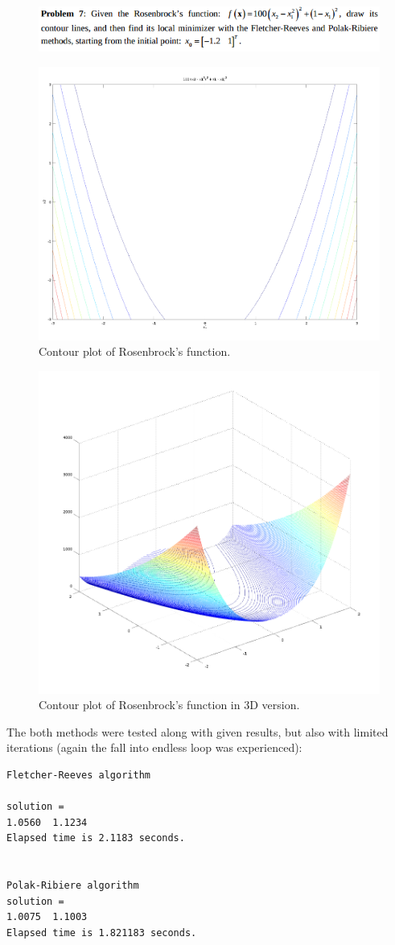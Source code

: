 \documentclass[eng,openany]{mgr}
\begin{document}
\clearpage
\begin{figure}[h]
\centering
\includegraphics[width=0.7\linewidth]{screenshot016}
\label{fig:screenshot016}
\end{figure}
\begin{figure}[h]
	\centering
	\includegraphics[width=0.5\linewidth]{screenshot002}
	\caption{Contour plot of Rosenbrock's function.}
	\label{fig:screenshot002}
\end{figure}
\begin{figure}[h]
	\centering
	\includegraphics[width=0.5\linewidth]{screenshot007}
	\caption{Contour plot of Rosenbrock's function in 3D version.}
	\label{fig:screenshot007}
\end{figure}

The both methods were tested along with given results, but also with limited iterations (again the fall into endless loop was experienced):
\begin{lstlisting}
Fletcher-Reeves algorithm

solution =
1.0560  1.1234
Elapsed time is 2.1183 seconds.


Polak-Ribiere algorithm
solution =
1.0075  1.1003
Elapsed time is 1.821183 seconds.
\end{lstlisting}
\end{document}
